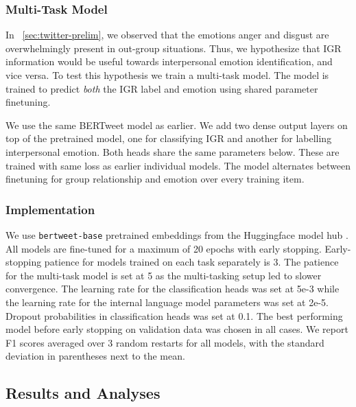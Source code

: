 \subsubsection{Multi-Task Model}

In \textsection~\ref{sec:twitter-prelim}, we observed that the emotions anger and disgust are overwhelmingly present in out-group situations. Thus, we hypothesize that IGR information would be useful towards interpersonal emotion identification, and vice versa. To test this hypothesis we train a multi-task model. The model is trained to predict \emph{both} the IGR label and emotion using shared parameter finetuning.

We use the same BERTweet model as earlier. We add two dense output layers on top of the pretrained model, one for classifying IGR and another for labelling interpersonal emotion. Both heads share the same parameters below. These are trained with same loss as earlier individual models. The model alternates between finetuning for group relationship and emotion over every training item.

\subsubsection{Implementation}
We use \texttt{bertweet-base} pretrained embeddings from the Huggingface model hub \citep{wolf-etal-2020-transformers}. All models are fine-tuned for a maximum of 20 epochs with early stopping. Early-stopping patience for models trained on each task separately is 3. The patience for the multi-task model is set at 5 as the multi-tasking setup led to slower convergence. The learning rate for the classification heads was set at 5e-3 while the learning rate for the internal language model parameters was set at 2e-5. Dropout probabilities in classification heads was set at 0.1. The best performing model before early stopping on validation data was chosen in all cases. We report F1 scores averaged over 3 random restarts for all models, with the standard deviation in parentheses next to the mean.

\subsection{Results and Analyses}
\label{subsec:twitter-results}



